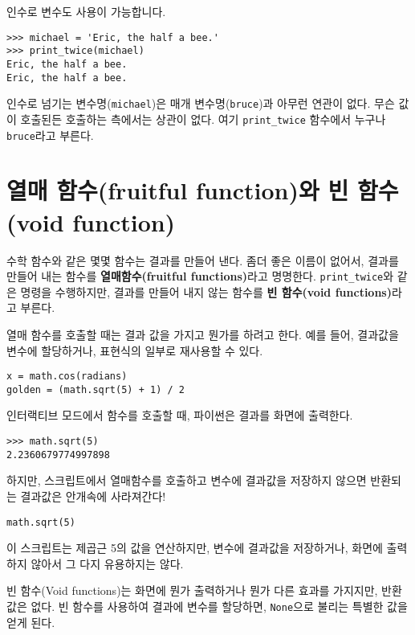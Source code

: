 인수로 변수도 사용이 가능합니다.

\beforeverb
\begin{verbatim}
>>> michael = 'Eric, the half a bee.'
>>> print_twice(michael)
Eric, the half a bee.
Eric, the half a bee.
\end{verbatim}
\afterverb
%

인수로 넘기는 변수명({\tt michael})은 매개 변수명({\tt bruce})과 아무런 연관이 없다.
무슨 값이 호출된든 호출하는 측에서는 상관이 없다. 여기 \verb"print_twice" 함수에서 누구나 {\tt bruce}라고 부른다. 

\section{열매 함수(fruitful function)와 빈 함수(void function)}


수학 함수와 같은 몇몇 함수는 결과를 만들어 낸다. 좀더 좋은 이름이 없어서, 결과를 만들어 내는 함수를 {\bf 열매함수(fruitful functions)}라고 명명한다.
\verb"print_twice"와 같은 명령을 수행하지만, 결과를 만들어 내지 않는 함수를 {\bf 빈 함수(void functions)}라고 부른다.

열매 함수를 호출할 때는 결과 값을 가지고 뭔가를 하려고 한다. 예를 들어, 결과값을 변수에 할당하거나, 표현식의 일부로 재사용할 수 있다.

\beforeverb
\begin{verbatim}
x = math.cos(radians)
golden = (math.sqrt(5) + 1) / 2
\end{verbatim}
\afterverb
%
인터랙티브 모드에서 함수를 호출할 때, 파이썬은 결과를 화면에 출력한다.

\beforeverb
\begin{verbatim}
>>> math.sqrt(5)
2.2360679774997898
\end{verbatim}
\afterverb
%
하지만, 스크립트에서 열매함수를 호출하고 변수에 결과값을 저장하지 않으면 반환되는 결과값은 안개속에 사라져간다!

\beforeverb
\begin{verbatim}
math.sqrt(5)
\end{verbatim}
\afterverb
%
이 스크립트는 제곱근 5의 값을 연산하지만, 변수에 결과값을 저장하거나, 화면에 출력하지 않아서 그 다지 유용하지는 않다.


빈 함수(Void functions)는 화면에 뭔가 출력하거나 뭔가 다른 효과를 가지지만, 반환값은 없다.
빈 함수를 사용하여 결과에 변수를 할당하면, {\tt None}으로 불리는 특별한 값을 얻게 된다.

